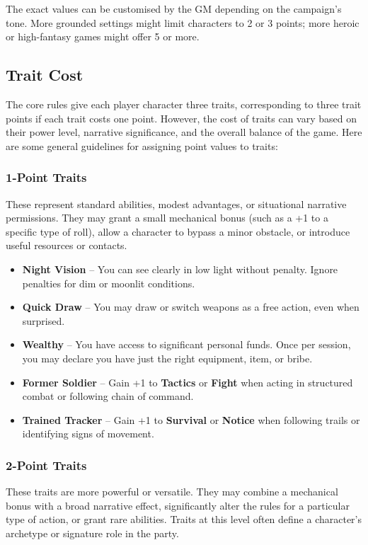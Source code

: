 The exact values can be customised by the GM depending on the campaign’s tone. More grounded settings might limit characters to 2 or 3 points; more heroic or high-fantasy games might offer 5 or more.

\subsection{Trait Cost}

The core rules give each player character three traits, corresponding to three trait points if each trait costs one point. However, the cost of traits can vary based on their power level, narrative significance, and the overall balance of the game. Here are some general guidelines for assigning point values to traits:

\subsubsection{1-Point Traits}
These represent standard abilities, modest advantages, or situational narrative permissions. They may grant a small mechanical bonus (such as a +1 to a specific type of roll), allow a character to bypass a minor obstacle, or introduce useful resources or contacts.

    \begin{itemize}
        \item \textbf{Night Vision} – You can see clearly in low light without penalty. Ignore penalties for dim or moonlit conditions.
        \item \textbf{Quick Draw} – You may draw or switch weapons as a free action, even when surprised.
        \item \textbf{Wealthy} – You have access to significant personal funds. Once per session, you may declare you have just the right equipment, item, or bribe.
        \item \textbf{Former Soldier} – Gain +1 to \textbf{Tactics} or \textbf{Fight} when acting in structured combat or following chain of command.
        \item \textbf{Trained Tracker} – Gain +1 to \textbf{Survival} or \textbf{Notice} when following trails or identifying signs of movement.
    \end{itemize}

\subsubsection{2-Point Traits}
These traits are more powerful or versatile. They may combine a mechanical bonus with a broad narrative effect, significantly alter the rules for a particular type of action, or grant rare abilities. Traits at this level often define a character’s archetype or signature role in the party.

